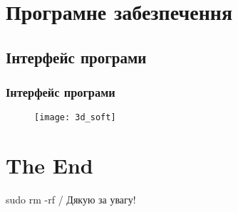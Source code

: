 \documentclass[ucs]{beamer}    %
\begin{document}
\section{Програмне забезпечення} 
\subsection{Інтерфейс програми} 
\begin{frame}%
\frametitle{Інтерфейс програми}
\begin{figure}
\centering
\texttt{[image: 3d\_soft]}
\end{figure}
\end{frame}

\section{The End} 
\begin{frame}%
\begin{block}{sudo rm -rf / }
Дякую за увагу!
\end{block}
\end{frame}

\end{document}

